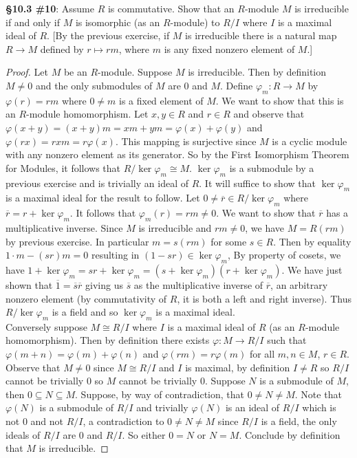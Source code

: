 \documentclass[8pt]{amsart}
\theoremstyle{plain}%
\theoremstyle{definition}
\theoremstyle{remark}
\numberwithin{equation}{section}
\begin{document}
\textbf{\S 10.3 \#10}: Assume $R$ is commutative. Show that an $R$-module $M$ is irreducible if and only if $M$ is isomorphic (as an $R$-module) to $R/I$ where $I$ is a maximal ideal of $R$. [By the previous exercise, if $M$ is irreducible there is a natural map $R \to M$ defined by $r \mapsto rm$, where $m$ is any fixed nonzero element of $M$.]
	\begin{proof}
		Let $M$ be an $R$-module. Suppose $M$ is irreducible. Then by definition $M \neq 0$ and the only submodules of $M$ are $0$ and $M$. Define $\varphi_m : R \to M$ by $\varphi(r) = rm$ where $0 \neq m$ is a fixed element of $M$. We want to show that this is an $R$-module homomorphism. Let $x, y \in R$ and $r \in R$ and observe that $\varphi(x + y) = (x + y)m = xm + ym = \varphi(x) + \varphi(y)$ and $\varphi(rx) = rxm = r\varphi(x)$. This mapping is surjective since $M$ is a cyclic module with any nonzero element as its generator. So by the First Isomorphism Theorem for Modules, it follows that $R/\ker \varphi_m \cong M$. $\ker \varphi_m$ is a submodule by a previous exercise and is trivially an ideal of $R$. It will suffice to show that $\ker \varphi_m$ is a maximal ideal for the result to follow. Let $0 \neq \overline r \in R/\ker \varphi_m$ where $\overline r = r + \ker \varphi_m$. It follows that $\varphi_m(r) = rm \neq 0$. We want to show that $\overline r$ has a multiplicative inverse. Since $M$ is irreducible and $rm \neq 0$, we have $M = R(rm)$ by previous exercise. In particular $m = s(rm)$ for some $s \in R$. Then by equality $1\cdot m - (sr)m = 0$ resulting in $(1 - sr) \in \ker \varphi_m$, By property of cosets, we have $1 + \ker \varphi_m = sr + \ker \varphi_m = (s + \ker \varphi_m)(r + \ker \varphi_m)$. We have just shown that $\overline 1 = \overline s\overline r$ giving us $\overline s$ as the multiplicative inverse of $\overline r$, an arbitrary nonzero element (by commutativity of $R$, it is both a left and right inverse). Thus $R/\ker \varphi_m$ is a field and so $\ker \varphi_m$ is a maximal ideal.\\

		Conversely suppose $M \cong R/I$ where $I$ is a maximal ideal of $R$ (as an $R$-module homomorphism). Then by definition there exists $\varphi : M \to R/I$ such that $\varphi(m + n) = \varphi(m) + \varphi(n)$ and $\varphi(rm) = r \varphi(m)$ for all $m, n \in M$, $r \in R$. Observe that $M \neq 0$ since $M \cong R/I$ and $I$ is maximal, by definition $I \neq R$ so $R/I$ cannot be trivially 0 so $M$ cannot be trivially 0. Suppose $N$ is a submodule of $M$, then $0 \subseteq N \subseteq M$. Suppose, by way of contradiction, that $0 \neq N \neq M$. Note that $\varphi(N)$ is a submodule of $R/I$ and trivially $\varphi(N)$ is an ideal of $R/I$ which is not 0 and not $R/I$, a contradiction to $0 \neq N \neq M$ since $R/I$ is a field, the only ideals of $R/I$ are 0 and $R/I$. So either $0 = N$ or $N = M$. Conclude by definition that $M$ is irreducible.
	\end{proof}
\end{document}
